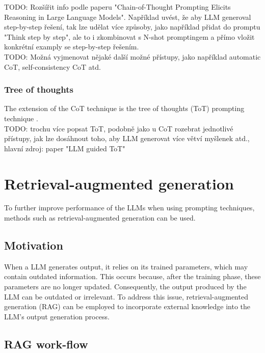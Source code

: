 TODO: Rozšířit info podle paperu "Chain-of-Thought Prompting Elicits Reasoning in Large Language Models". Například uvést, že aby LLM generoval step-by-step řešení, tak lze udělat více způsoby, jako například přidat do promptu "Think step by step", ale to i zkombinovat s N-shot promptingem a přímo vložit konkrétní examply se step-by-step řešením. \\

TODO: Možná vyjmenovat nějaké další možné přístupy, jako například automatic CoT, self-consistency CoT atd. \\


\subsubsection{Tree of thoughts}

The extension of the CoT technique is the tree of thoughts (ToT) prompting technique \cite{Long2023}. \\

TODO: trochu více popsat ToT, podobně jako u CoT rozebrat jednotlivé přístupy, jak lze dosáhnout toho, aby LLM generovat více větví myšlenek atd., hlavní zdroj: paper "LLM guided ToT" \\


\section{Retrieval-augmented generation}

To further improve performance of the LLMs when using prompting techniques, methods such as retrieval-augmented generation can be used.

\subsection{Motivation}

When a LLM generates output, it relies on its trained parameters, which may contain outdated information. This occurs because, after the training phase, these parameters are no longer updated. Consequently, the output produced by the LLM can be outdated or irrelevant. To address this issue, retrieval-augmented generation (RAG) can be employed to incorporate external knowledge into the LLM's output generation process.


\subsection{RAG work-flow}

